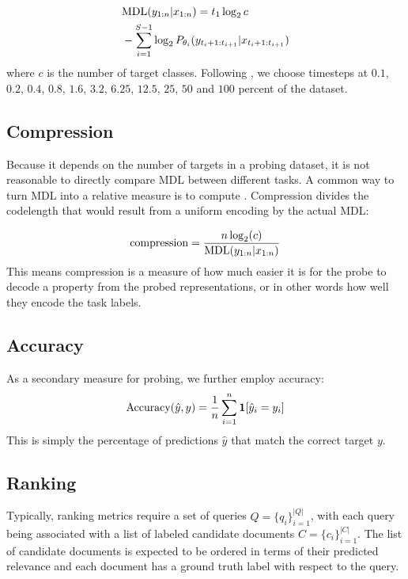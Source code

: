 \begin{equation}
    \begin{aligned}
         & \text{MDL}(y_{1:n} | x_{1:n}) = t_1 \log_2 c                                        \\
         & - \sum_{i=1}^{S-1} \log_2 P_{\theta_i}(y_{t_i + 1:t_{i+1}} | x_{t_i + 1:t_{i+1}})
    \end{aligned}
\end{equation}
where $c$ is the number of target classes.
Following \cite{voita-titov-2020-information}, we choose timesteps at $0.1$, $0.2$, $0.4$, $0.8$, $1.6$, $3.2$, $6.25$, $12.5$, $25$, $50$ and $100$ percent of the dataset.

\subsection{Compression}
Because it depends on the number of targets in a probing dataset, it is not reasonable to directly compare MDL between different tasks. A common way to turn MDL into a relative measure is to compute . Compression divides the codelength that would result from a uniform encoding by the actual MDL:

\begin{equation}
    \text{compression} = \frac{n \log_2(c)}{\text{MDL}(y_{1:n} | x_{1:n})}
\end{equation}
This means compression is a measure of how much easier it is for the probe to decode a property from the probed representations, or in other words how well they encode the task labels.

\subsection{Accuracy}
As a secondary measure for probing, we further employ accuracy:
\begin{equation}
    \text{Accuracy}(\hat{y}, y) = \frac{1}{n} \sum_{i=1}^n \mathbf{1} [\hat{y}_i = y_i]
\end{equation}
This is simply the percentage of predictions $\hat{y}$ that match the correct target $y$.

\subsection{Ranking}
Typically, ranking metrics require a set of queries $Q=\{q_i\}_{i=1}^{|Q|}$, with each query being associated with a list of labeled candidate documents $C=\{c_i\}_{i=1}^{|C|}$. The list of candidate documents is expected to be ordered in terms of their predicted relevance and each document has a ground truth label with respect to the query.


